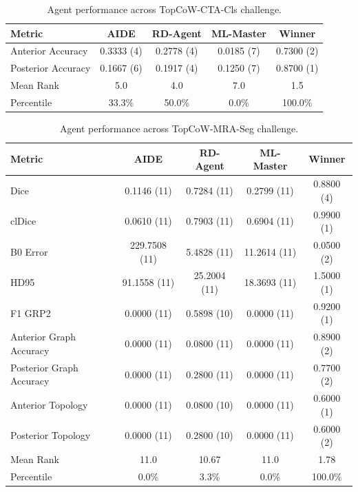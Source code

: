 \begin{table}[htbp]
\centering
\small
\caption{Agent performance across TopCoW-CTA-Cls challenge.}
\vspace{3pt} \label{tab:topcow-track1-task3}
\begin{tabular}{lcccc}
\toprule
\textbf{Metric} & \textbf{AIDE} & \textbf{RD-Agent} & \textbf{ML-Master} & \textbf{Winner} \\
\midrule
Anterior Accuracy & 0.3333 (4) & 0.2778 (4) & 0.0185 (7) & 0.7300 (2) \\
Posterior Accuracy & 0.1667 (6) & 0.1917 (4) & 0.1250 (7) & 0.8700 (1) \\
\midrule
Mean Rank & 5.0 & 4.0 & 7.0 & 1.5 \\
Percentile & 33.3\% & 50.0\% & 0.0\% & 100.0\% \\
\bottomrule
\end{tabular}
\end{table}

\begin{table}[htbp]
\centering
\small
\caption{Agent performance across TopCoW-MRA-Seg challenge.}
\vspace{3pt} \label{tab:topcow-track2-task1}
\begin{tabular}{lcccc}
\toprule
\textbf{Metric} & \textbf{AIDE} & \textbf{RD-Agent} & \textbf{ML-Master} & \textbf{Winner} \\
\midrule
Dice & 0.1146 (11) & 0.7284 (11) & 0.2799 (11) & 0.8800 (4) \\
clDice & 0.0610 (11) & 0.7903 (11) & 0.6904 (11) & 0.9900 (1) \\
B0 Error & 229.7508 (11) & 5.4828 (11) & 11.2614 (11) & 0.0500 (2) \\
HD95 & 91.1558 (11) & 25.2004 (11) & 18.3693 (11) & 1.5000 (1) \\
F1 GRP2 & 0.0000 (11) & 0.5898 (10) & 0.0000 (11) & 0.9200 (1) \\
Anterior Graph Accuracy & 0.0000 (11) & 0.0800 (11) & 0.0000 (11) & 0.8900 (2) \\
Posterior Graph Accuracy & 0.0000 (11) & 0.2800 (11) & 0.0000 (11) & 0.7700 (2) \\
Anterior Topology & 0.0000 (11) & 0.0800 (10) & 0.0000 (11) & 0.6000 (1) \\
Posterior Topology & 0.0000 (11) & 0.2800 (10) & 0.0000 (11) & 0.6000 (2) \\
\midrule
Mean Rank & 11.0 & 10.67 & 11.0 & 1.78 \\
Percentile & 0.0\% & 3.3\% & 0.0\% & 100.0\% \\
\bottomrule
\end{tabular}
\end{table}

